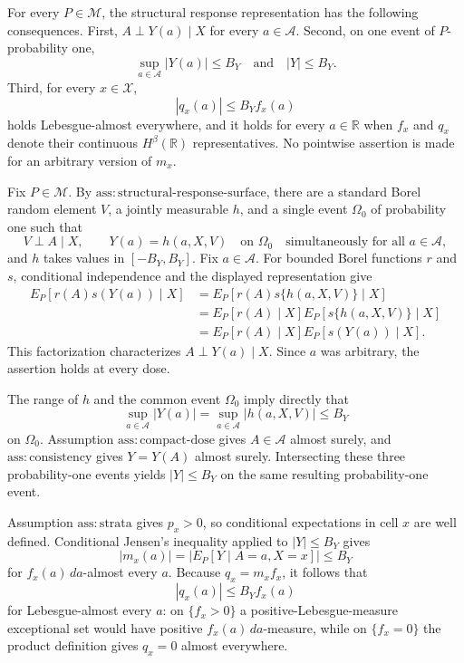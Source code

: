 For every \(P\in\mathcal M\), the structural response representation has the following consequences.  First, \(A\perp Y(a)\mid X\) for every \(a\in\mathcal A\).  Second, on one event of \(P\)-probability one,
\[
 \sup_{a\in\mathcal A}|Y(a)|\le B_Y
 \quad\text{and}\quad |Y|\le B_Y.
\]
Third, for every \(x\in\mathcal X\),
\[
 |q_x(a)|\le B_Yf_x(a)
\]
holds Lebesgue-almost everywhere, and it holds for every \(a\in\mathbb R\) when \(f_x\) and \(q_x\) denote their continuous \(H^\beta(\mathbb R)\) representatives.  No pointwise assertion is made for an arbitrary version of \(m_x\).

Fix \(P\in\mathcal M\).  By \(\mathrm{ass{:}structural\text{-}response\text{-}surface}\), there are a standard Borel random element \(V\), a jointly measurable \(h\), and a single event \(\Omega_0\) of probability one such that
\[
 V\perp A\mid X,
 \qquad
 Y(a)=h(a,X,V)\quad\text{on }\Omega_0
 \quad\text{simultaneously for all }a\in\mathcal A,
\]
and \(h\) takes values in \([-B_Y,B_Y]\).  Fix \(a\in\mathcal A\).  For bounded Borel functions \(r\) and \(s\), conditional independence and the displayed representation give
\[
 \begin{aligned}
 E_P[r(A)s(Y(a))\mid X]
 &=E_P[r(A)s\{h(a,X,V)\}\mid X]\\
 &=E_P[r(A)\mid X]E_P[s\{h(a,X,V)\}\mid X]\\
 &=E_P[r(A)\mid X]E_P[s(Y(a))\mid X].
 \end{aligned}
\]
This factorization characterizes \(A\perp Y(a)\mid X\).  Since \(a\) was arbitrary, the assertion holds at every dose.

The range of \(h\) and the common event \(\Omega_0\) imply directly that
\[
 \sup_{a\in\mathcal A}|Y(a)|
 =\sup_{a\in\mathcal A}|h(a,X,V)|\le B_Y
\]
on \(\Omega_0\).  Assumption \(\mathrm{ass{:}compact\text{-}dose}\) gives \(A\in\mathcal A\) almost surely, and \(\mathrm{ass{:}consistency}\) gives \(Y=Y(A)\) almost surely.  Intersecting these three probability-one events yields \(|Y|\le B_Y\) on the same resulting probability-one event.

Assumption \(\mathrm{ass{:}strata}\) gives \(p_x>0\), so conditional expectations in cell \(x\) are well defined.  Conditional Jensen's inequality applied to \(|Y|\le B_Y\) gives
\[
 |m_x(a)|=|E_P[Y\mid A=a,X=x]|\le B_Y
\]
for \(f_x(a)\,da\)-almost every \(a\).  Because \(q_x=m_xf_x\), it follows that
\[
 |q_x(a)|\le B_Yf_x(a)
\]
for Lebesgue-almost every \(a\): on \(\{f_x>0\}\) a positive-Lebesgue-measure exceptional set would have positive \(f_x(a)\,da\)-measure, while on \(\{f_x=0\}\) the product definition gives \(q_x=0\) almost everywhere.

